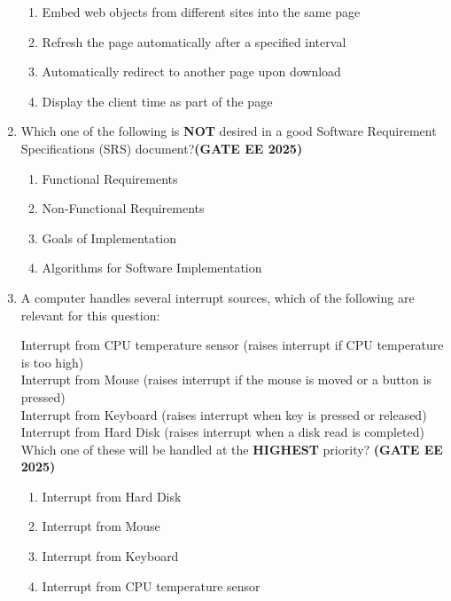 \documentclass[journal,12pt,onecolumn]{IEEEtran}
\theoremstyle{remark}
\begin{document}
\begin{enumerate}
\begin{enumerate}
\item Embed web objects from different sites into the same page
\item Refresh the page automatically after a specified interval
\item Automatically redirect to another page upon download
\item Display the client time as part of the page
\end{enumerate}


\item  Which one of the following is \textbf{NOT} desired in a good Software Requirement Specifications (SRS) document?\hfill \textbf{(GATE EE 2025)}

\begin{enumerate}
\item Functional Requirements
\item Non-Functional Requirements
\item Goals of Implementation
\item Algorithms for Software Implementation
\end{enumerate}


\item A computer handles several interrupt sources, which of the following are relevant for this question:

 Interrupt from CPU temperature sensor (raises interrupt if CPU temperature is too high)
\\
     Interrupt from Mouse (raises interrupt if the mouse is moved or a button is pressed)
     \\
    Interrupt from Keyboard (raises interrupt when key is pressed or released)
    \\
Interrupt from Hard Disk (raises interrupt when a disk read is completed)
\\
  Which one of these will be handled at the \textbf{HIGHEST} priority?
  \hfill \textbf{(GATE EE 2025)}
\begin{enumerate}
\item  Interrupt from Hard Disk
\item   Interrupt from Mouse
\item   Interrupt from Keyboard
\item   Interrupt from CPU temperature sensor
\end{enumerate}



\end{enumerate}
\end{document}
